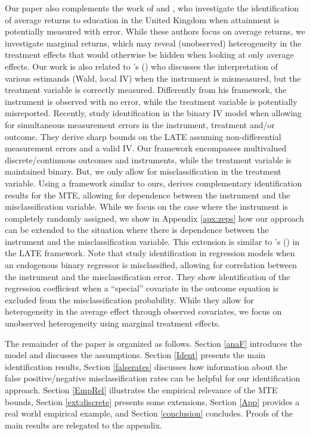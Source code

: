 \documentclass[11pt,reqno]{amsart}
\theoremstyle{plain}
\numberwithin{equation}{section}
\begin{document}
Our paper also complements the work of \cite{Battistinal2011} and \cite{Battistinal2014}, who investigate the identification of average returns to education in the United Kingdom when attainment is potentially measured with error. While these authors focus on average returns, we investigate marginal returns, which may reveal (unobserved) heterogeneity in the treatment effects that would otherwise be hidden when looking at only average effects. Our work is also related to \citeauthor{Chalak2017}'s (\citeyear{Chalak2017}) who discusses the interpretation of various estimands (Wald, local IV) when the instrument is mismeasured, but the treatment variable is correctly measured. Differently from his framework, the instrument is observed with no error, while the treatment variable is potentially misreported. Recently, \cite{Jiangal2020} study identification in the binary IV model when allowing for simultaneous measurement errors in the instrument, treatment and/or outcome. They derive sharp bounds on the LATE assuming non-differential measurement errors and a valid IV. Our framework encompasses multivalued discrete/continuous outcomes and instruments, while the treatment variable is maintained binary. But, we only allow for misclassification in the treatment variable. Using a framework similar to ours, \cite{Possebom2021} derives complementary identification results for the MTE, allowing for dependence between the instrument and the misclassification variable. While we focus on the case where the instrument is completely randomly assigned, we show in Appendix \ref{apx:zeps} how our approach can be extended to the situation where there is dependence between the instrument and the misclassification variable. This extension is similar to \citeauthor{Ura2018}'s (\citeyear{Ura2018}) in the LATE framework. Note that \cite{KasaharaShimotsu2021} study identification in regression models when an endogenous binary regressor is misclassified, allowing for correlation between the instrument and the misclassification error. They show identification of the regression coefficient when a ``special'' covariate in the outcome equation is excluded from the misclassification probability. While they allow for heterogeneity in the average effect through observed covariates, we focus on unobserved heterogeneity using marginal treatment effects. 


The remainder of the paper is organized as follows. Section \ref{anaF} introduces the model and discusses the assumptions. Section \ref{Ident} presents the main identification results, Section \ref{falserates} discusses how information about the false positive/negative misclassification rates can be helpful for our identification approach. Section \ref{EmpRel} illustrates the empirical relevance of the MTE bounds, Section \ref{ext:discrete} presents some extensions, Section \ref{App} provides a real world empirical example, and Section \ref{conclusion} concludes. Proofs of the main results are relegated to the appendix.
\end{document}
